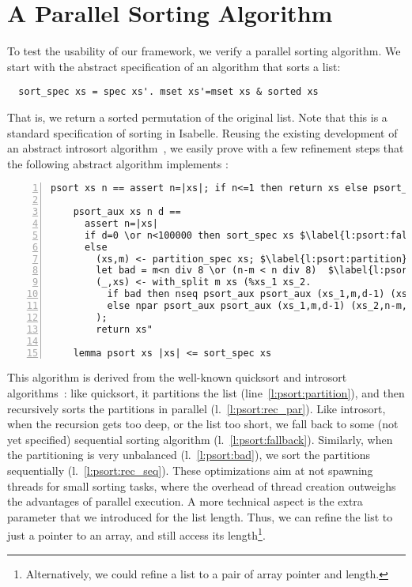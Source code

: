\documentclass[a4paper,UKenglish,cleveref, autoref, thm-restate]{lipics-v2021}
\begin{document}
  \section{A Parallel Sorting Algorithm}\label{sec:parsort}
  To test the usability of our framework, we verify a parallel sorting algorithm.
  We start with the abstract specification of an algorithm that sorts a list:
  \begin{lstlisting}
  sort_spec xs = spec xs'. mset xs'=mset xs & sorted xs
  \end{lstlisting}
  That is, we return a sorted permutation of the original list.
  Note that this is a standard specification of sorting in Isabelle.
  Reusing the existing development of an abstract introsort algorithm~\cite{La20},
  we easily prove with a few refinement steps that the following abstract algorithm implements :
  \begin{lstlisting}[numbers=left,xleftmargin=1.9em,frame=single,framexleftmargin=.5em]
    psort xs n == assert n=|xs|; if n<=1 then return xs else psort_aux$\hspace*{-1pt}$ xs$\hspace*{-1pt}$ n$\hspace*{-1pt}$ (log2$\hspace*{-1pt}$ n$\hspace*{-1pt}$ *$\hspace*{-1pt}$ 2)

    psort_aux xs n d ==
      assert n=|xs|
      if d=0 \or n<100000 then sort_spec xs $\label{l:psort:fallback}$
      else
        (xs,m) <- partition_spec xs; $\label{l:psort:partition}$
        let bad = m<n div 8 \or (n-m < n div 8)  $\label{l:psort:bad}$
        (_,xs) <- with_split m xs (%xs_1 xs_2.
          if bad then nseq psort_aux psort_aux (xs_1,m,d-1) (xs_2,n-m,d-1) $\label{l:psort:rec_seq}$
          else npar psort_aux psort_aux (xs_1,m,d-1) (xs_2,n-m,d-1)  $\label{l:psort:rec_par}$
        );
        return xs"

    lemma psort xs |xs| <= sort_spec xs
  \end{lstlisting}
  This algorithm is derived from the well-known quicksort and introsort algorithms~\cite{Muss97}:
  like quicksort, it partitions the list (line~\ref{l:psort:partition}), and then recursively sorts the partitions in parallel (l.~\ref{l:psort:rec_par}).
  Like introsort, when the recursion gets too deep, or the list too short, we fall back to
  some (not yet specified) sequential sorting algorithm (l.~\ref{l:psort:fallback}). Similarly, when the partitioning is very unbalanced (l.~\ref{l:psort:bad}),
  we sort the partitions sequentially (l.~\ref{l:psort:rec_seq}). These optimizations aim at not spawning threads for small sorting tasks, where
  the overhead of thread creation outweighs the advantages of parallel execution.
  A more technical aspect is the extra parameter  that we introduced for the list length.
  Thus, we can refine the list to just a pointer to an array, and still access its length\footnote{Alternatively, we could refine a list to a pair of array pointer and length.}.
\end{document}
